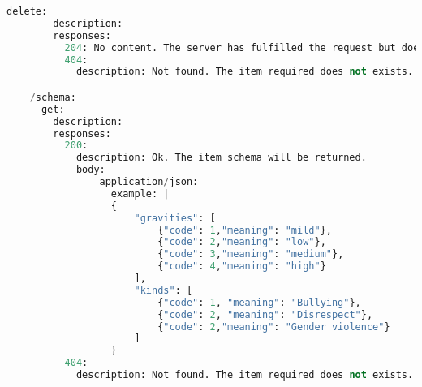 \begin{lstlisting}[language=python,frame=none]
      delete:
        description:
        responses:
          204: No content. The server has fulfilled the request but does not need to return an entity-body.
          404:
            description: Not found. The item required does not exists.

    /schema:
      get:
        description:
        responses:
          200:
            description: Ok. The item schema will be returned.
            body:
                application/json:
                  example: |
                  {
                      "gravities": [
                          {"code": 1,"meaning": "mild"},
                          {"code": 2,"meaning": "low"},
                          {"code": 3,"meaning": "medium"},
                          {"code": 4,"meaning": "high"}
                      ],
                      "kinds": [
                          {"code": 1, "meaning": "Bullying"},
                          {"code": 2, "meaning": "Disrespect"},
                          {"code": 2,"meaning": "Gender violence"}
                      ]
                  }
          404:
            description: Not found. The item required does not exists.

\end{lstlisting}


